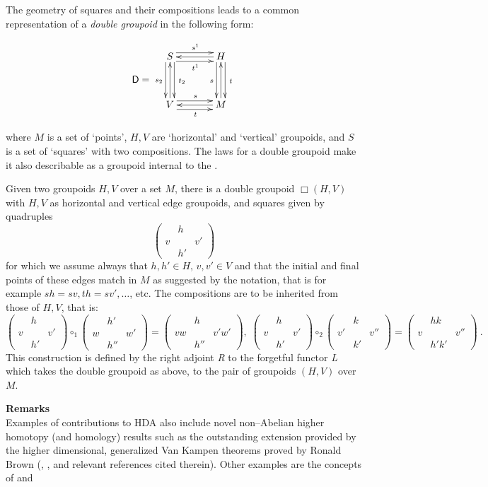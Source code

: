 \documentclass[12pt]{article}
\theoremstyle{plain}
\theoremstyle{definition}
\numberwithin{equation}{section}
\newcommand{\D}{\mathcal D}
\newcommand{\med}{\medbreak}
\newcommand{\<}{{\langle}}
\newcommand{\quadr}[4]
{\begin{pmatrix} & #1& \\[-1.1ex] #2 & & #3\\[-1.1ex]& #4&
 \end{pmatrix}}
\def\D{\mathsf{D}}
\begin{document}
The geometry of squares and their compositions leads to a common representation of a \emph{double groupoid} in the following form:
\bigbreak

\begin{equation}
\label{squ} \D= \vcenter{\xymatrix @=3pc {S \ar @<1ex> [r] ^{s^1} \ar @<-1ex> [r]
_{t^1} \ar @<1ex> [d]^{\, t_2}  \ar @<-1ex> [d]_{s_2} & H   \ar[l]
\ar @<1ex> [d]^{\,t}
 \ar @<-1ex> [d]_s \\
V \ar [u]  \ar @<1ex> [r] ^s \ar @<-1ex> [r] _t & M \ar [l] \ar[u]}}
\end{equation}
\bigbreak

where $M$ is a set of `points', $H,V$ are
`horizontal' and `vertical' groupoids, and $S$ is a set of
`squares' with two compositions. The laws for a  double groupoid
make it also describable as a groupoid internal to the .


\med
Given two groupoids $H,V$  over a set $M$, there is a double groupoid $\Box(H,V)$ with $H,V$ as
 horizontal and vertical edge groupoids, and squares given by
 quadruples
 \bigbreak
\begin{equation}
\begin{pmatrix} & h& \\[-0.9ex] v & & v'\\[-0.9ex]& h'&
\end{pmatrix}
\end{equation}
for which we assume always that $h,h' \in H, \, v,v' \in V$ and
that the initial and final points of these edges match in $M$ as
suggested by the notation, that is for example $sh=sv, th=sv',
\ldots$, etc. The compositions are to be inherited from those of
$H,V$,
 that is:
 \bigbreak
\begin{equation}
\quadr{h}{v}{v'}{h'} \circ_1\quadr{h'}{w}{w'}{h''}
=\quadr{h}{vw}{v'w'}{h''}, \;\quadr{h}{v}{v'}{h'}
\circ_2\quadr{k}{v'}{v''}{k'}=\quadr{hk}{v}{v''}{h'k'} ~.
\end{equation}
\bigbreak
This construction is defined by the right adjoint \textsl{R} to the forgetful functor \textsl{L} which takes the double groupoid as above, to the pair of groupoids $(H,V)$ over $M$. 

\textbf{Remarks}\\
Examples of contributions to HDA also include novel non--Abelian higher homotopy (and homology) results such as the outstanding extension provided by the higher dimensional, generalized Van Kampen theorems proved by Ronald Brown (\cite{BR67}, \cite{BR-AR71-2k5}, \cite{HPJ2k5} and relevant references cited therein). Other examples are the concepts of  and 
\end{document}
